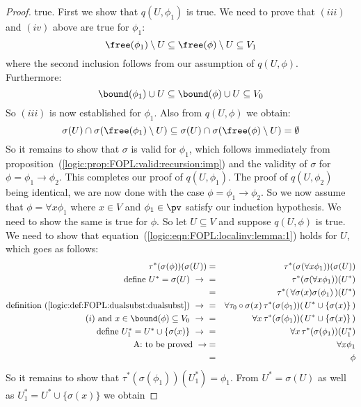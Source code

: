 \begin{proof}
true. First we show that $q(U,\phi_{1})$ is true. We need to prove
that $(iii)$ and $(iv)$ above are true for $\phi_{1}$:
    \[
    \free(\phi_{1})\setminus U\subseteq\free(\phi)\setminus U\subseteq V_{1}
    \]
where the second inclusion follows from our assumption of
$q(U,\phi)$. Furthermore:
    \[
    \bound(\phi_{1})\cup U\subseteq\bound(\phi)\cup U\subseteq V_{0}
    \]
So $(iii)$ is now established for $\phi_{1}$. Also from $q(U,\phi)$
we obtain:
    \[
    \sigma(U)\cap\sigma(\free(\phi_{1})\setminus U)\subseteq
    \sigma(U)\cap\sigma(\free(\phi)\setminus U)=\emptyset
    \]
So it remains to show that $\sigma$ is valid for $\phi_{1}$, which
follows immediately from
proposition~(\ref{logic:prop:FOPL:valid:recursion:imp}) and the
validity of $\sigma$ for $\phi=\phi_{1}\to\phi_{2}$. This completes
our proof of $q(U,\phi_{1})$. The proof of $q(U,\phi_{2})$ being
identical, we are now done with the case $\phi=\phi_{1}\to\phi_{2}$.
So we now assume that $\phi=\forall x\phi_{1}$ where $x\in V$ and
$\phi_{1}\in\pv$ satisfy our induction hypothesis. We need to show
the same is true for $\phi$. So let $U\subseteq V$ and suppose
$q(U,\phi)$ is true. We need to show that
equation~(\ref{logic:eqn:FOPL:localinv:lemma:1}) holds for $U$,
which goes as follows:
    \begin{eqnarray*}\tau^{*}(\sigma(\phi))(\sigma(U))
        &=&\tau^{*}(\sigma(\forall x\phi_{1}))(\sigma(U))\\
        \mbox{define $U^{*}=\sigma(U)$}\ \to\ 
        &=&\tau^{*}(\sigma(\forall x\phi_{1}))(U^{*})\\
        &=&\tau^{*}(\,\forall\sigma(x)\sigma(\phi_{1})\,)(U^{*})\\
        \mbox{definition~(\ref{logic:def:FOPL:dualsubst:dualsubst})}\ \to\ 
        &=&\forall \tau_{0}\circ\sigma(x)\,\tau^{*}(
            \sigma(\phi_{1}))(\,U^{*}\cup\{\sigma(x)\}\,)\\
        \mbox{$(i)$ and $x\in\bound(\phi)\subseteq V_{0}$}\ \to\ 
        &=&\forall x\,\tau^{*}(
            \sigma(\phi_{1}))(\,U^{*}\cup\{\sigma(x)\}\,)\\
        \mbox{define $U_{1}^{*}=U^{*}\cup\{\sigma(x)\}$}\ \to\ 
        &=&\forall x\,\tau^{*}(\sigma(\phi_{1}))(U_{1}^{*})\\
        \mbox{A: to be proved}\ \rightarrow&=&\forall x\phi_{1}\\
        &=&\phi
    \end{eqnarray*}
So it remains to show that $\tau^{*}(\sigma(\phi_{1}))(U_{1}^{*})=\phi_{1}$. 
From $U^{*}=\sigma(U)$ as well as  $U_{1}^{*}=U^{*}\cup\{\sigma(x)\}$ we obtain

\end{proof}
